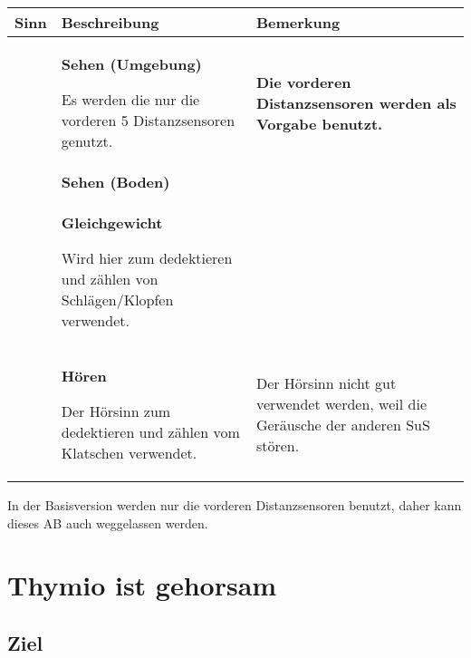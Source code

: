 \documentclass[12pt]{article}
\begin{document}
\begin{center}
\begin{tabular}[b]{|c|p{5cm}|p{5cm}|}
\hline
\bf Sinn&\bf Beschreibung&\bf Bemerkung\\\hline
\raisebox{-0.75\height}{}&{\bf Sehen (Umgebung)}\par Es werden die nur die vorderen 5 Distanzsensoren genutzt.& {\bf Die vorderen Distanzsensoren werden als Vorgabe benutzt.}\\\hline
\raisebox{-0.75\height}{}&{\bf Sehen (Boden)}\par & \\\hline
\raisebox{-0.75\height}{}&{\bf Gleichgewicht}\par Wird hier zum dedektieren und zählen von Schlägen/Klopfen verwendet. & \\\hline
\raisebox{-0.75\height}{}&{\bf Hören}\par Der Hörsinn zum dedektieren und zählen vom Klatschen verwendet.& Der Hörsinn nicht gut verwendet werden, weil die Geräusche der anderen SuS stören.\\\hline
\end{tabular}
\end{center}

In der Basisversion werden nur die vorderen Distanzsensoren benutzt, daher kann dieses AB auch weggelassen werden. 


\section*{Thymio ist gehorsam}

\subsection*{Ziel}
\end{document}
